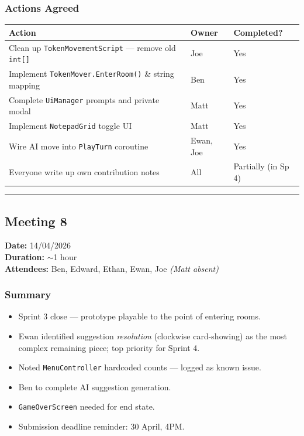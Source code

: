 \subsubsection*{Actions Agreed}
\begin{table}[H]
\centering
\begin{tabular}{|p{8cm}|l|l|}
\hline
\textbf{Action} & \textbf{Owner} & \textbf{Completed?} \\ \hline
Clean up \texttt{TokenMovementScript} --- remove old \texttt{int[]} & Joe & Yes \\ \hline
Implement \texttt{TokenMover.EnterRoom()} \& string mapping & Ben & Yes \\ \hline
Complete \texttt{UiManager} prompts and private modal & Matt & Yes \\ \hline
Implement \texttt{NotepadGrid} toggle UI & Matt & Yes \\ \hline
Wire AI move into \texttt{PlayTurn} coroutine & Ewan, Joe & Yes \\ \hline
Everyone write up own contribution notes & All & Partially (in Sp 4) \\ \hline
\end{tabular}
\end{table}

\smallskip
\hrule
\smallskip

\subsection{Meeting 8}
\textbf{Date:} 14/04/2026 \\
\textbf{Duration:} $\sim$1 hour \\
\textbf{Attendees:} Ben, Edward, Ethan, Ewan, Joe \textit{(Matt absent)}

\subsubsection*{Summary}
\begin{itemize}
    \item Sprint 3 close --- prototype playable to the point of entering rooms.
    \item Ewan identified suggestion \textit{resolution} (clockwise card-showing) as the most complex remaining piece; top priority for Sprint 4.
    \item Noted \texttt{MenuController} hardcoded counts --- logged as known issue.
    \item Ben to complete AI suggestion generation.
    \item \texttt{GameOverScreen} needed for end state.
    \item Submission deadline reminder: 30 April, 4PM.
\end{itemize}

